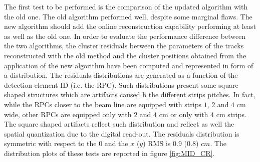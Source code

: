 The first test to be performed is the comparison of the updated algorithm with the old one.
The old algorithm performed well, despite some marginal flaws.
The new algorithm should add the online reconstruction capability performing at least as well as the old one.
In order to evaluate the performance difference between the two algorithms, the cluster residuals between the parameters of the tracks reconstructed with the old method and the cluster positions obtained from the application of the new algorithm have been computed and represented in form of a distribution.
The residuals distributions are generated as a function of the detection element ID (i.e. the RPC).
Such distributions present some square shaped structures which are artifacts caused b the different strips pitches.
In fact, while the RPCs closer to the beam line are equipped with strips $1$, $2$ and $4$ cm wide, other RPCs are equipped only with $2$ and $4$ cm or only with $4$ cm strips.
The square shaped artifacts reflect such distribution and reflect as well the spatial quantization due to the digital read-out.
The residuals distribution is symmetric with respect to the $0$ and the $x$ ($y$) RMS is $0.9$ ($0.8$) $cm$.
The distribution plots of these tests are reported in figure \ref{fig:MID_CR}.

